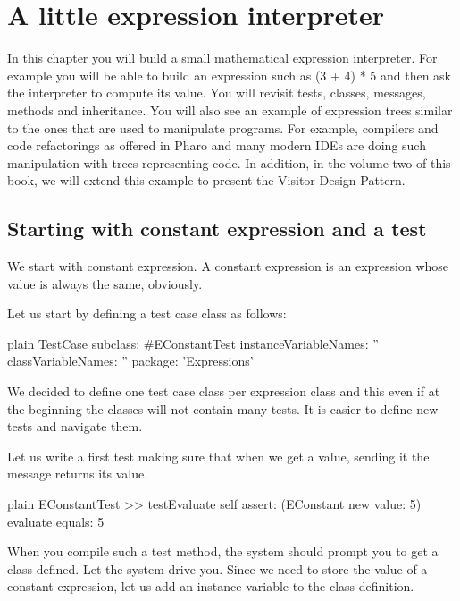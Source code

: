 \documentclass[10pt,twoside,english]{_support/latex/sbabook/sbabook}
\begin{document}
\frontmatter
\pagestyle{plain}

\tableofcontents*
\clearpage\listoffigures

\mainmatter

\chapter{A little expression interpreter}\label{cha:expressions}
In this chapter you will build a small mathematical expression interpreter. For example you will be able to build an expression such as  (3 + 4) * 5 and then ask the interpreter to compute its value. You will revisit tests, classes, messages, methods and inheritance. 
You will also see an example of expression trees similar to the ones that are used to manipulate programs. For example, compilers and code refactorings as offered in Pharo and many modern IDEs are doing such manipulation with trees representing code. 
In addition, in the volume two of this book, we will extend this example to present the Visitor Design Pattern. 
\section{Starting with constant expression and a test}
We start with constant expression. A constant expression is an expression whose value is always the same, obviously.

Let us start by defining a test case class as follows: 

\begin{displaycode}{plain}
TestCase subclass: #EConstantTest
	instanceVariableNames: ''
	classVariableNames: ''
	package: 'Expressions'
\end{displaycode}

 We decided to define one test case class per expression class and this even if at the beginning the classes will not contain many tests. It is easier to define new tests and navigate them.
 
Let us write a first test making sure that when we get a value, sending it the  message returns its value. 

\begin{displaycode}{plain}
EConstantTest >> testEvaluate 
	self assert: (EConstant new value: 5) evaluate equals: 5
\end{displaycode}

When you compile such a test method, the system should prompt you to get a class  defined. 
Let the system drive you. Since we need to store the value of a constant expression, let us add an instance variable 
to the class definition. 
\end{document}
